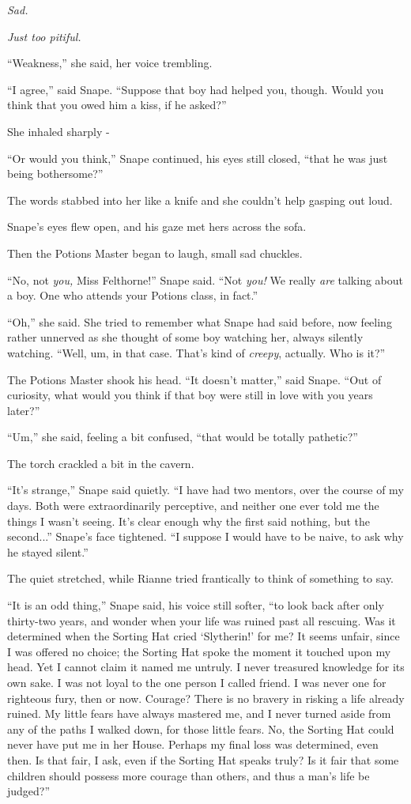 \emph{Sad.}

\emph{Just too p}\emph{itiful.}

``Weakness,'' she said, her voice trembling.

``I agree,'' said Snape. ``Suppose that boy had helped you, though. Would you think that you owed him a kiss, if he asked?''

She inhaled sharply -

``Or would you think,'' Snape continued, his eyes still closed, ``that he was just being bothersome?''

The words stabbed into her like a knife and she couldn't help gasping out loud.

Snape's eyes flew open, and his gaze met hers across the sofa.

Then the Potions Master began to laugh, small sad chuckles.

``No, not \emph{you,} Miss Felthorne!'' Snape said. ``Not \emph{you!} We really \emph{are} talking about a boy. One who attends your Potions class, in fact.''

``Oh,'' she said. She tried to remember what Snape had said before, now feeling rather unnerved as she thought of some boy watching her, always silently watching. ``Well, um, in that case. That's kind of \emph{creepy}, actually. Who is it?''

The Potions Master shook his head. ``It doesn't matter,'' said Snape. ``Out of curiosity, what would you think if that boy were still in love with you years later?''

``Um,'' she said, feeling a bit confused, ``that would be totally pathetic?''

The torch crackled a bit in the cavern.

``It's strange,'' Snape said quietly. ``I have had two mentors, over the course of my days. Both were extraordinarily perceptive, and neither one ever told me the things I wasn't seeing. It's clear enough why the first said nothing, but the second...'' Snape's face tightened. ``I suppose I would have to be naive, to ask why he stayed silent.''

The quiet stretched, while Rianne tried frantically to think of something to say.

``It is an odd thing,'' Snape said, his voice still softer, ``to look back after only thirty-two years, and wonder when your life was ruined past all rescuing. Was it determined when the Sorting Hat cried `Slytherin!' for me? It seems unfair, since I was offered no choice; the Sorting Hat spoke the moment it touched upon my head. Yet I cannot claim it named me untruly. I never treasured knowledge for its own sake. I was not loyal to the one person I called friend. I was never one for righteous fury, then or now. Courage? There is no bravery in risking a life already ruined. My little fears have always mastered me, and I never turned aside from any of the paths I walked down, for those little fears. No, the Sorting Hat could never have put me in her House. Perhaps my final loss was determined, even then. Is that fair, I ask, even if the Sorting Hat speaks truly? Is it fair that some children should possess more courage than others, and thus a man's life be judged?''

